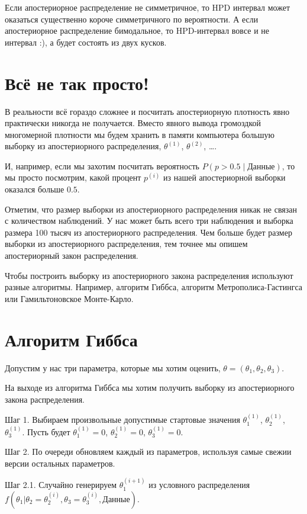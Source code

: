 \documentclass[11pt,russian,]{article}
\begin{document}
Если апостериорное распределение не симметричное, то HPD интервал может
оказаться существенно короче симметричного по вероятности. А если
апостериорное распределение бимодальное, то HPD-интервал вовсе и не
интервал :), а будет состоять из двух кусков.

\section{Всё не так просто!}\label{---}

В реальности всё гораздо сложнее и посчитать апостериорную плотность
явно практически никогда не получается. Вместо явного вывода громоздкой
многомерной плотности мы будем хранить в памяти компьютера большую
выборку из апостериорного распределения, \(\theta^{(1)}\),
\(\theta^{(2)}\), \ldots.

И, например, если мы захотим посчитать вероятность
\(P(p>0.5 \mid \text{Данные})\), то мы просто посмотрим, какой процент
\(p^{(i)}\) из нашей апостериорной выборки оказался больше \(0.5\).

Отметим, что размер выборки из апостериорного распределения никак не
связан с количеством наблюдений. У нас может быть всего три наблюдения и
выборка размера 100 тысяч из апостериорного распределения. Чем больше
будет размер выборки из апостериорного распределения, тем точнее мы
опишем апостериорный закон распределения.

Чтобы построить выборку из апостериорного закона распределения
используют разные алгоритмы. Например, алгоритм Гиббса, алгоритм
Метрополиса-Гастингса или Гамильтоновское Монте-Карло.

\section{Алгоритм Гиббса}\label{-}

Допустим у нас три параметра, которые мы хотим оценить,
\(\theta = (\theta_1, \theta_2, \theta_3)\).

На выходе из алгоритма Гиббса мы хотим получить выборку из
апостериорного закона распределения.

Шаг 1. Выбираем произвольные допустимые стартовые значения
\(\theta_1^{(1)}\), \(\theta_2^{(1)}\), \(\theta_3^{(1)}\). Пусть будет
\(\theta_1^{(1)} = 0\), \(\theta_2^{(1)} = 0\), \(\theta_3^{(1)}=0\).

Шаг 2. По очереди обновляем каждый из параметров, используя самые свежии
версии остальных параметров.

Шаг 2.1. Случайно генерируем \(\theta_1^{(i+1)}\) из условного
распределения
\(f(\theta_1|\theta_2 = \theta_2^{(i)}, \theta_3 = \theta_3^{(i)}, \text{Данные})\).
\end{document}
